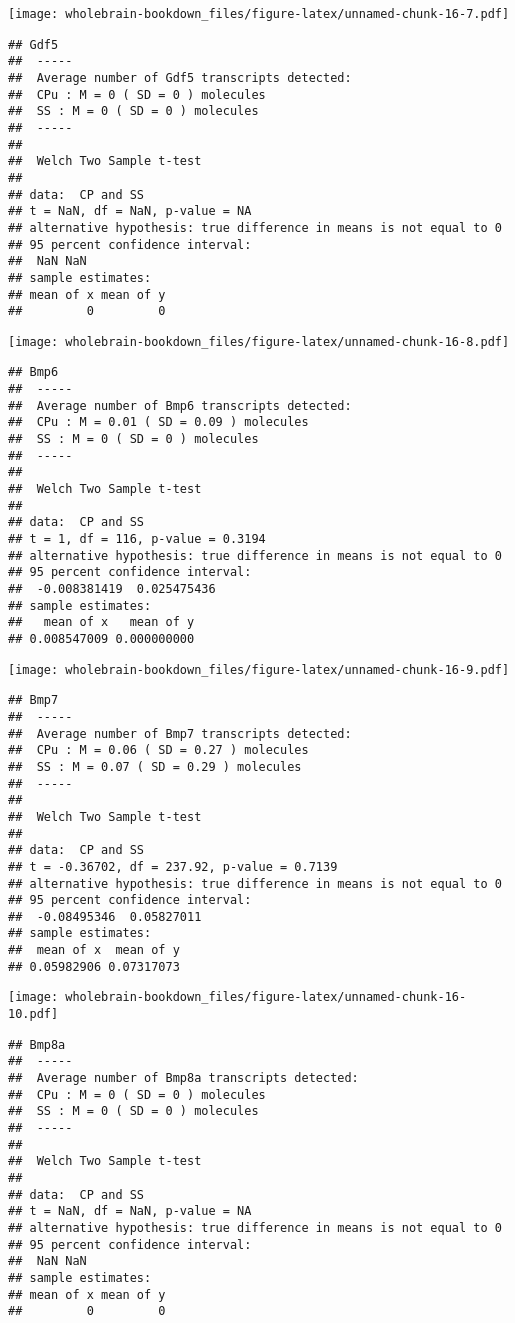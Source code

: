 \documentclass[]{book}
\theoremstyle{definition}
\theoremstyle{definition}
\theoremstyle{remark}
\begin{document}
\texttt{[image: wholebrain-bookdown\_files/figure-latex/unnamed-chunk-16-7.pdf]}

\begin{verbatim}
## Gdf5
##  -----
##  Average number of Gdf5 transcripts detected:
##  CPu : M = 0 ( SD = 0 ) molecules 
##  SS : M = 0 ( SD = 0 ) molecules
##  -----
## 
##  Welch Two Sample t-test
## 
## data:  CP and SS
## t = NaN, df = NaN, p-value = NA
## alternative hypothesis: true difference in means is not equal to 0
## 95 percent confidence interval:
##  NaN NaN
## sample estimates:
## mean of x mean of y 
##         0         0
\end{verbatim}

\texttt{[image: wholebrain-bookdown\_files/figure-latex/unnamed-chunk-16-8.pdf]}

\begin{verbatim}
## Bmp6
##  -----
##  Average number of Bmp6 transcripts detected:
##  CPu : M = 0.01 ( SD = 0.09 ) molecules 
##  SS : M = 0 ( SD = 0 ) molecules
##  -----
## 
##  Welch Two Sample t-test
## 
## data:  CP and SS
## t = 1, df = 116, p-value = 0.3194
## alternative hypothesis: true difference in means is not equal to 0
## 95 percent confidence interval:
##  -0.008381419  0.025475436
## sample estimates:
##   mean of x   mean of y 
## 0.008547009 0.000000000
\end{verbatim}

\texttt{[image: wholebrain-bookdown\_files/figure-latex/unnamed-chunk-16-9.pdf]}

\begin{verbatim}
## Bmp7
##  -----
##  Average number of Bmp7 transcripts detected:
##  CPu : M = 0.06 ( SD = 0.27 ) molecules 
##  SS : M = 0.07 ( SD = 0.29 ) molecules
##  -----
## 
##  Welch Two Sample t-test
## 
## data:  CP and SS
## t = -0.36702, df = 237.92, p-value = 0.7139
## alternative hypothesis: true difference in means is not equal to 0
## 95 percent confidence interval:
##  -0.08495346  0.05827011
## sample estimates:
##  mean of x  mean of y 
## 0.05982906 0.07317073
\end{verbatim}

\texttt{[image: wholebrain-bookdown\_files/figure-latex/unnamed-chunk-16-10.pdf]}

\begin{verbatim}
## Bmp8a
##  -----
##  Average number of Bmp8a transcripts detected:
##  CPu : M = 0 ( SD = 0 ) molecules 
##  SS : M = 0 ( SD = 0 ) molecules
##  -----
## 
##  Welch Two Sample t-test
## 
## data:  CP and SS
## t = NaN, df = NaN, p-value = NA
## alternative hypothesis: true difference in means is not equal to 0
## 95 percent confidence interval:
##  NaN NaN
## sample estimates:
## mean of x mean of y 
##         0         0
\end{verbatim}
\end{document}
